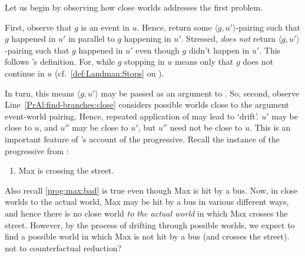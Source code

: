 \begin{note}
  Let us begin by observing how close worlds addresses the first problem.

  First, observe that \(g\) is an event in \(u\).
  Hence, \AlgFindBranches{} return some \(\langle g,u' \rangle\)-pairing such that \(g\) happened in \(u'\) in parallel to \(g\) happening in \(u'\).
  Stressed, \AlgFindBranches{} \emph{does not} return \(\langle g,u' \rangle\)-pairing such that \(g\) happened in \(u'\) even though \(g\) didn't happen in \(u'\).
  This follows \citeauthor{Landman:1992wh}'s definition.
  For, while \(g\) stopping in \(u\) means only that \(g\) does not continue in \(u\) (cf.~\autoref{def:Landman:Stops} on ).

  In turn, this means \(\langle g,u' \rangle\) may be passed as an argument to \AlgFindBranches{}.
  So, second, observe Line~\autoref{PrAl:find-branches:close} considers possible worlds close to the argument event-world pairing.
  Hence, repeated application of \AlgFindBranches{} may lead to `drift'.
  \(u'\) may be close to \(u\), and \(u''\) may be close to \(u'\), but \(u''\) need not be close to \(u\).
  This is an important feature of \citeauthor{Landman:1992wh}'s account of the progressive.
  Recall the instance of the progressive from :
  \begin{enumerate}
  \item
    Max is crossing the street.
  \end{enumerate}
  Also recall \ref{prog:max:bad} is true even though Max is hit by a bus.
  Now, in close worlds to the actual world, Max may be hit by a bus in various different ways, and hence there is no close world \emph{to the actual world} in which Max crosses the street.
  However, by the process of drifting through possible worlds, we expect to find a possible world in which Max is not hit by a bus (and crosses the street).
  {
    \color{red} not to counterfactual reduction?
  }
\end{note}


